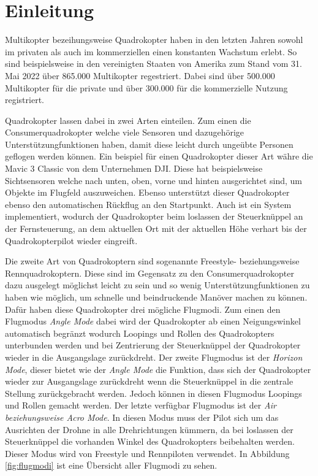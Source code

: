 
\chapter{Einleitung}

Multikopter bezeihungsweise Quadrokopter haben in den letzten Jahren sowohl im privaten als auch im kommerziellen einen konstanten Wachstum erlebt. So sind beispielsweise in den vereinigten Staaten von Amerika zum Stand vom 31. Mai 2022 über 865.000 Multikopter regestriert. Dabei sind über 500.000 Multikopter für die private und über 300.000 für die kommerzielle Nutzung registriert. \cites{droneregistrationFAA}{dronestat1}{dronestat2}{dronestat3}

Quadrokopter lassen dabei in zwei Arten einteilen. Zum einen die Consumerquadrokopter welche viele  Sensoren und dazugehörige Unterstützungfunktionen haben, damit diese leicht durch ungeübte Personen geflogen werden können. Ein beispiel für einen Quadrokopter dieser Art währe die Mavic 3 Classic von dem Unternehmen DJI. Diese hat beispielsweise Sichtsensoren welche nach unten, oben, vorne und hinten ausgerichtet sind, um Objekte im Flugfeld auszuweichen. Ebenso unterstützt dieser Quadrokopter ebenso den automatischen Rückflug an den Startpunkt. Auch ist ein System implementiert, wodurch der Quadrokopter beim loslassen der Steuerknüppel an der Fernsteuerung, an dem aktuellen Ort mit der aktuellen Höhe verhart bis der Quadrokopterpilot wieder eingreift. \cite{djiMavicClassic}

Die zweite Art von Quadrokoptern sind sogenannte Freestyle- beziehungsweise Rennquadrokoptern. Diese sind im Gegensatz zu den Consumerquadrokopter dazu ausgelegt möglichst leicht zu sein und so wenig Unterstützungfunktionen zu haben wie möglich, um schnelle und beindruckende Manöver machen zu können. Dafür haben diese Quadrokopter drei mögliche Flugmodi. Zum einen den Flugmodus \textit{Angle Mode} dabei wird der Quadrokopter ab einen Neigungswinkel automatisch begränzt wodurch Loopings und Rollen des Quadrokopters unterbunden werden und bei Zentrierung der Steuerknüppel der Quadrokopter wieder in die Ausgangslage zurückdreht. Der zweite Flugmodus ist der \textit{Horizon Mode}, dieser bietet wie der \textit{Angle Mode} die Funktion, dass sich der Quadrokopter wieder zur Ausgangslage zurückdreht wenn die Steuerknüppel in die zentrale Stellung zurückgebracht werden. Jedoch können in diesen Flugmodus Loopings und Rollen gemacht werden. Der letzte verfügbar Flugmodus ist der \textit{Air beziehungsweise Acro Mode}. In diesen Modus muss der Pilot sich um das Ausrichten der Drohne in alle Drehrichtungen kümmern, da bei loslassen der Steuerknüppel die vorhanden Winkel des Quadrokopters beibehalten werden. Dieser Modus wird von Freestyle und Rennpiloten verwendet. In Abbildung \ref{fig:flugmodi} ist eine Übersicht aller Flugmodi zu sehen. \cite{wedioFlugmodi}

